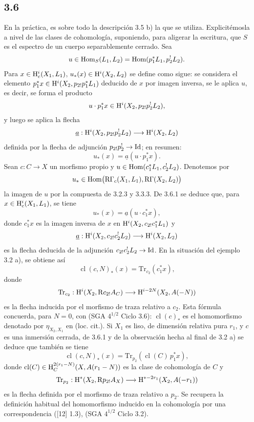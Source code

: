 \subsection*{3.6}
En la práctica, es sobre todo la descripción 3.5 b) la que se utiliza. Explicitémosla a nivel de las clases de cohomología, suponiendo, para aligerar la escritura, que $S$ es el espectro de un cuerpo separablemente cerrado. Sea
\[
u\in\operatorname{Hom}_S(L_1,L_2)=\operatorname{Hom}(p_1^*L_1,p_2^!L_2).
\]
Para $x\in\mathrm{H}_c^i(X_1,L_1)$, $u_*(x)\in\mathrm{H}^i(X_2,L_2)$ se define como sigue: se considera el elemento $p_1^*x\in\mathrm{H}^i(X_2,p_{2!}p_1^*L_1)$ deducido de $x$ por imagen inversa, se le aplica $u$, es decir, se forma el producto
\[
u\cdot p_1^*x\in \mathrm{H}^i(X_2,p_{2!}p_2^!L_2),
\]
y luego se aplica la flecha
\[
\underline{a}:\mathrm{H}^i(X_2,p_{2!}p_2^!L_2)\longrightarrow \mathrm{H}^i(X_2,L_2)
\]
definida por la flecha de adjunción $p_{2!}p_2^!\to\mathrm{Id}$; en resumen:
\begin{equation}
u_*(x)=\underline{a}(u\cdot p_1^*x).
\tag{3.6.1}
\end{equation}
Sean $c:C\to X$ un morfismo propio y $u\in\operatorname{Hom}(c_1^*L_1,c_2^!L_2)$. Denotemos por
\[
u_*\in\operatorname{Hom}\bigl(\mathrm{R}\Gamma_c(X_1,L_1),\mathrm{R}\Gamma(X_2,L_2)\bigr)
\]
la imagen de $u$ por la compuesta de 3.2.3 y 3.3.3. De 3.6.1 se deduce que, para $x\in\mathrm{H}_c^i(X_1,L_1)$, se tiene
\begin{equation}
u_*(x)=\underline{a}(u\cdot c_1^*x),
\tag{3.6.2}
\end{equation}
donde $c_1^*x$ es la imagen inversa de $x$ en $\mathrm{H}^i(X_2,c_{2!}c_1^*L_1)$ y
\[
\underline{a}:\mathrm{H}^i(X_2,c_{2!}c_2^!L_2)\longrightarrow \mathrm{H}^i(X_2,L_2)
\]
es la flecha deducida de la adjunción $c_{2!}c_2^!L_2\to\mathrm{Id}$. En la situación del ejemplo 3.2 a), se obtiene así
\begin{equation}
\operatorname{cl}(c,N)_*(x)=\mathrm{Tr}_{c_2}(c_1^*x),
\tag{3.6.3}
\end{equation}
donde
\[
\mathrm{Tr}_{c_2}:\mathrm{H}^i(X_2,\mathrm{R} c_{2!}A_C)\longrightarrow\mathrm{H}^{i-2N}(X_2,A(-N))
\]
es la flecha inducida por el morfismo de traza relativo a $c_2$. Esta fórmula concuerda, para $N=0$, con (SGA $4^{1/2}$ Ciclo 3.6): $\operatorname{cl}(c)_*$ es el homomorfismo denotado por $\eta_{X_2,X_1}$ en (loc. cit.). Si $X_1$ es liso, de dimensión relativa pura $r_1$, y $c$ es una inmersión cerrada, de 3.6.1 y de la observación hecha al final de 3.2 a) se deduce que también se tiene
\begin{equation}
\operatorname{cl}(c,N)_*(x)=\mathrm{Tr}_{p_2}(\operatorname{cl}(C)\,p_1^*x),
\tag{3.6.4}
\end{equation}
donde $\operatorname{cl}(C)\in \mathrm{H}_C^{2(r_1-N)}(X,A(r_1-N))$ es la clase de cohomología de $C$ y
\[
\mathrm{Tr}_{p_2}:\mathrm{H}^*(X_2,\mathrm{R} p_{2!}A_X)\longrightarrow \mathrm{H}^{*-2r_1}(X_2,A(-r_1))
\]
es la flecha definida por el morfismo de traza relativo a $p_2$. Se recupera la definición habitual del homomorfismo inducido en la cohomología por una correspondencia ([12] 1.3), (SGA $4^{1/2}$ Ciclo 3.2).

